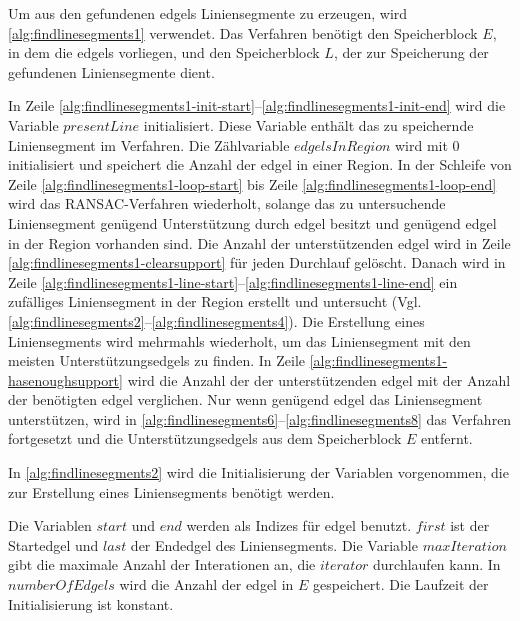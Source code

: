 Um aus den gefundenen \glspl{edgel} Liniensegmente zu erzeugen, wird \autoref{alg:findlinesegments1} verwendet. Das
 Verfahren benötigt den Speicherblock $E$, in dem die \glspl{edgel} vorliegen, und den Speicherblock $L$, der zur
 Speicherung der gefundenen Liniensegmente dient.

In Zeile \ref{alg:findlinesegments1-init-start}--\ref{alg:findlinesegments1-init-end} wird die Variable
 $\mathit{presentLine}$ initialisiert. Diese Variable enthält das zu speichernde Liniensegment im Verfahren.
 Die Zählvariable $\mathit{edgelsInRegion}$ wird mit $0$ initialisiert und speichert die Anzahl der \gls{edgel} in
 einer Region. In der Schleife von Zeile \ref{alg:findlinesegments1-loop-start} bis Zeile
 \ref{alg:findlinesegments1-loop-end} wird das RANSAC-Verfahren wiederholt, solange das zu untersuchende Liniensegment
 genügend Unterstützung durch \gls{edgel} besitzt und genügend \gls{edgel} in der Region vorhanden sind. Die Anzahl der
 unterstützenden \gls{edgel} wird in Zeile \ref{alg:findlinesegments1-clearsupport} für jeden Durchlauf gelöscht.
 Danach wird in Zeile \ref{alg:findlinesegments1-line-start}--\ref{alg:findlinesegments1-line-end} ein zufälliges
 Liniensegment in der Region erstellt und untersucht
 (Vgl. \autoref{alg:findlinesegments2}--\autoref{alg:findlinesegments4}). Die Erstellung eines Liniensegments wird
 mehrmahls wiederholt, um das Liniensegment mit den meisten Unterstützungsedgels zu finden. In Zeile
 \ref{alg:findlinesegments1-hasenoughsupport} wird die Anzahl der der unterstützenden \gls{edgel} mit der Anzahl der
 benötigten \gls{edgel} verglichen. Nur wenn genügend \gls{edgel} das Liniensegment unterstützen, wird in
 \autoref{alg:findlinesegments6}--\autoref{alg:findlinesegments8} das Verfahren fortgesetzt und die
 Unterstützungsedgels aus dem Speicherblock $E$ entfernt.

In \autoref{alg:findlinesegments2} wird die Initialisierung der Variablen vorgenommen, die zur Erstellung eines
 Liniensegments benötigt werden.

Die Variablen $\mathit{start}$ und $\mathit{end}$ werden als Indizes für \gls{edgel} benutzt. $\mathit{first}$ ist der
 Startedgel und $\mathit{last}$ der Endedgel des Liniensegments. Die Variable $\mathit{maxIteration}$ gibt die maximale
 Anzahl der Interationen an, die $\mathit{iterator}$ durchlaufen kann. In $\mathit{numberOfEdgels}$ wird die Anzahl der
 \gls{edgel} in $E$ gespeichert. Die Laufzeit der Initialisierung ist konstant.

